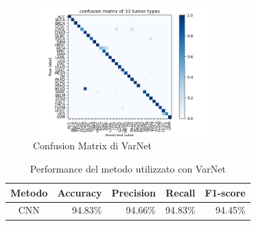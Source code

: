 \begin{figure}[h!]
    \centering
    \includegraphics[width=0.6\textwidth]{images/cnfMatrices/cnf_matrix_varnet.png}
    \caption{Confusion Matrix di VarNet}
    \label{fig:cnf_matrix_varnet}
\end{figure}

\begin{table}[h!]
    \centering
    \caption{Performance del metodo utilizzato con VarNet}
    \begin{tabular}{crrrr}
        \toprule
         Metodo & Accuracy & Precision & Recall & F1-score \\
         \midrule
         CNN    & 94.83\%    & 94.66\%     & 94.83\%  & 94.45\%     \\
         \bottomrule
    \end{tabular}
    \label{tab:method_score_VarNet}
\end{table}


